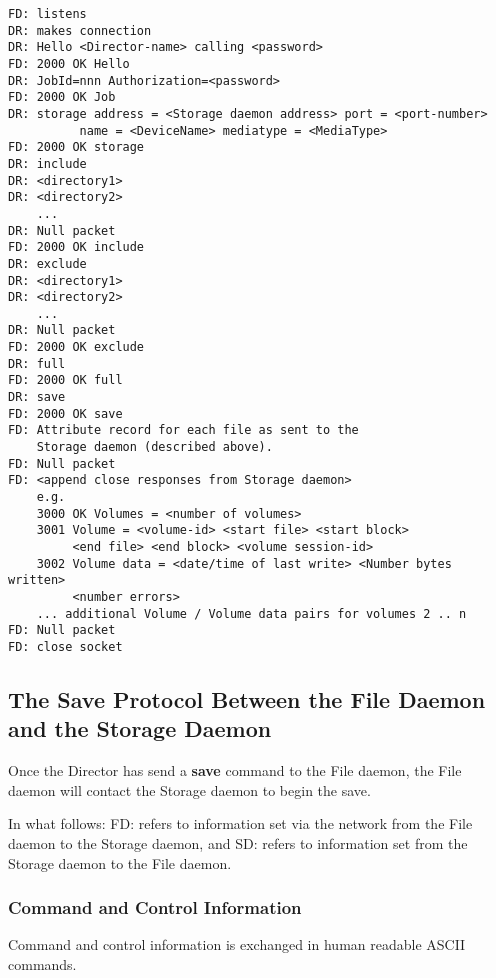 \footnotesize
\begin{verbatim}
FD: listens
DR: makes connection
DR: Hello <Director-name> calling <password>
FD: 2000 OK Hello
DR: JobId=nnn Authorization=<password>
FD: 2000 OK Job
DR: storage address = <Storage daemon address> port = <port-number>
          name = <DeviceName> mediatype = <MediaType>
FD: 2000 OK storage
DR: include
DR: <directory1>
DR: <directory2>
    ...
DR: Null packet
FD: 2000 OK include
DR: exclude
DR: <directory1>
DR: <directory2>
    ...
DR: Null packet
FD: 2000 OK exclude
DR: full
FD: 2000 OK full
DR: save
FD: 2000 OK save
FD: Attribute record for each file as sent to the
    Storage daemon (described above).
FD: Null packet
FD: <append close responses from Storage daemon>
    e.g.
    3000 OK Volumes = <number of volumes>
    3001 Volume = <volume-id> <start file> <start block>
         <end file> <end block> <volume session-id>
    3002 Volume data = <date/time of last write> <Number bytes written>
         <number errors>
    ... additional Volume / Volume data pairs for volumes 2 .. n
FD: Null packet
FD: close socket
\end{verbatim}
\normalsize

\subsection*{The Save Protocol Between the File Daemon and the Storage Daemon}

Once the Director has send a {\bf save} command to the File daemon, the File
daemon will contact the Storage daemon to begin the save. 

In what follows: FD: refers to information set via the network from the File
daemon to the Storage daemon, and SD: refers to information set from the
Storage daemon to the File daemon. 

\subsubsection*{Command and Control Information}

Command and control information is exchanged in human readable ASCII commands.


